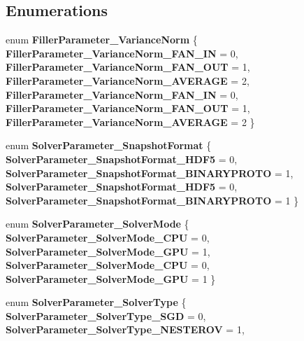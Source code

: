 \subsection*{Enumerations}
\begin{DoxyCompactItemize}
\item 
\mbox{\label{namespacecaffe_aebff8dd5e6547e6164a9f9e8a2fc36ff}} 
enum {\bfseries Filler\+Parameter\+\_\+\+Variance\+Norm} \{ \newline
{\bfseries Filler\+Parameter\+\_\+\+Variance\+Norm\+\_\+\+F\+A\+N\+\_\+\+IN} = 0, 
{\bfseries Filler\+Parameter\+\_\+\+Variance\+Norm\+\_\+\+F\+A\+N\+\_\+\+O\+UT} = 1, 
{\bfseries Filler\+Parameter\+\_\+\+Variance\+Norm\+\_\+\+A\+V\+E\+R\+A\+GE} = 2, 
{\bfseries Filler\+Parameter\+\_\+\+Variance\+Norm\+\_\+\+F\+A\+N\+\_\+\+IN} = 0, 
\newline
{\bfseries Filler\+Parameter\+\_\+\+Variance\+Norm\+\_\+\+F\+A\+N\+\_\+\+O\+UT} = 1, 
{\bfseries Filler\+Parameter\+\_\+\+Variance\+Norm\+\_\+\+A\+V\+E\+R\+A\+GE} = 2
 \}
\item 
\mbox{\label{namespacecaffe_a30b44a3e0a56c25111220d17a63ea6af}} 
enum {\bfseries Solver\+Parameter\+\_\+\+Snapshot\+Format} \{ {\bfseries Solver\+Parameter\+\_\+\+Snapshot\+Format\+\_\+\+H\+D\+F5} = 0, 
{\bfseries Solver\+Parameter\+\_\+\+Snapshot\+Format\+\_\+\+B\+I\+N\+A\+R\+Y\+P\+R\+O\+TO} = 1, 
{\bfseries Solver\+Parameter\+\_\+\+Snapshot\+Format\+\_\+\+H\+D\+F5} = 0, 
{\bfseries Solver\+Parameter\+\_\+\+Snapshot\+Format\+\_\+\+B\+I\+N\+A\+R\+Y\+P\+R\+O\+TO} = 1
 \}
\item 
\mbox{\label{namespacecaffe_aab2b9b950b8d19c2e2a5f2946bbef217}} 
enum {\bfseries Solver\+Parameter\+\_\+\+Solver\+Mode} \{ {\bfseries Solver\+Parameter\+\_\+\+Solver\+Mode\+\_\+\+C\+PU} = 0, 
{\bfseries Solver\+Parameter\+\_\+\+Solver\+Mode\+\_\+\+G\+PU} = 1, 
{\bfseries Solver\+Parameter\+\_\+\+Solver\+Mode\+\_\+\+C\+PU} = 0, 
{\bfseries Solver\+Parameter\+\_\+\+Solver\+Mode\+\_\+\+G\+PU} = 1
 \}
\item 
\mbox{\label{namespacecaffe_a1c9a20639a0fac18e4f65772b5345f01}} 
enum {\bfseries Solver\+Parameter\+\_\+\+Solver\+Type} \{ \newline
{\bfseries Solver\+Parameter\+\_\+\+Solver\+Type\+\_\+\+S\+GD} = 0, 
{\bfseries Solver\+Parameter\+\_\+\+Solver\+Type\+\_\+\+N\+E\+S\+T\+E\+R\+OV} = 1, 

\end{DoxyCompactItemize}

